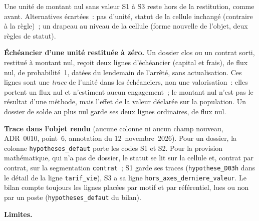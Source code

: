 \documentclass[a4paper,11pt]{article}
\newcommand{\code}[1]{\texttt{\small #1}}
\begin{document}
\noindent Une unité de montant nul sans valeur S1 à S3 reste hors de la
restitution, comme avant. Alternatives écartées~: pas d'unité, statut de
la cellule inchangé (contraire à la règle)~; un drapeau au niveau de la
cellule (forme nouvelle de l'objet, deux règles de statut).

\textbf{Échéancier d'une unité restituée à zéro.} Un dossier clos ou un
contrat sorti, restitué à montant nul, reçoit deux lignes d'échéancier
(capital et frais), de flux nul, de probabilité~1, datées du lendemain de
l'arrêté, sans actualisation. Ces lignes sont une \emph{trace} de l'unité
dans les échéanciers, non une valorisation~: elles portent un flux nul et
n'estiment aucun engagement~; le montant nul n'est pas le résultat d'une
méthode, mais l'effet de la valeur déclarée sur la population. Un dossier
de solde au plus nul garde ses deux lignes ordinaires, de flux nul.

\textbf{Trace dans l'objet rendu} (aucune colonne ni aucun champ nouveau,
ADR~0010, point~6, annotation du 12~novembre~2026). Pour un dossier, la
colonne \code{hypotheses\_defaut} porte les codes S1 et S2. Pour la
provision mathématique, qui n'a pas de dossier, le statut se lit sur la
cellule et, contrat par contrat, sur la segmentation \code{contrat}~;
S1 garde ses traces (\code{hypothese\_D03h} dans le détail de la ligne
\code{tarif\_vie}), S3 a sa ligne \code{hors\_axes\_derniere\_valeur}.
Le bilan compte toujours les lignes placées par motif et par référentiel,
lues ou non par un poste (\code{hypotheses\_defaut} du bilan).

\textbf{Limites.}
\end{document}
